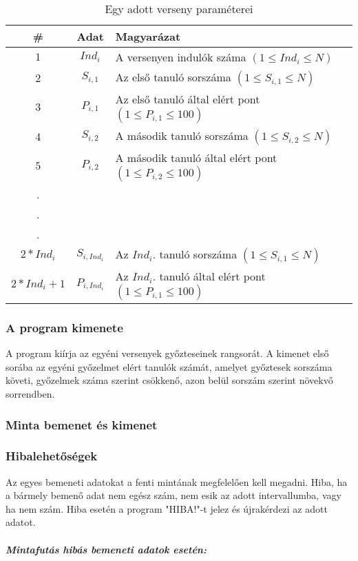 \documentclass[a4paper]{article}
\begin{document}
        \begin{table}[H]
          \centering
          \caption{Egy adott verseny paraméterei}
          \label{tab:table2}
          \begin{tabular}{ccl}
            \toprule
            \# & Adat & Magyarázat \\
            \midrule
            $1$ & $Ind_i$ & A versenyen indulók száma $(1 \leqslant Ind_i \leqslant N)$ \\
            $2$ & $S_{i,1}$ & Az első tanuló sorszáma $(1 \leqslant S_{i,1} \leqslant N)$ \\
            $3$ & $P_{i,1}$ & Az első tanuló által elért pont $(1 \leqslant P_{i,1} \leqslant 100)$ \\
            $4$ & $S_{i,2}$ & A második tanuló sorszáma $(1 \leqslant S_{i,2} \leqslant N)$ \\
            $5$ & $P_{i,2}$ & A második tanuló által elért pont $(1 \leqslant P_{i,2} \leqslant 100)$ \\
            . \\
            . \\
            . \\
            $2*Ind_i$ & $S_{i,Ind_i}$ & Az $Ind_i$. tanuló sorszáma $(1 \leqslant S_{i,1} \leqslant N)$ \\
            $2*Ind_i+1$ & $P_{i,Ind_i}$ & Az $Ind_i$. tanuló által elért pont $(1 \leqslant P_{i,1} \leqslant 100)$ \\
            \bottomrule
          \end{tabular}
        \end{table}
      \subsubsection{A program kimenete}
        A program kiírja az egyéni versenyek győzteseinek rangsorát.
        A kimenet első sorába az egyéni győzelmet elért tanulók számát,
        amelyet győztesek sorszáma követi, győzelmek száma szerint csökkenő,
        azon belül sorszám szerint növekvő sorrendben.
      \subsubsection{Minta bemenet és kimenet}
      \subsubsection{Hibalehetőségek}
        Az egyes bemeneti adatokat a fenti mintának megfelelően kell megadni.
        Hiba, ha a bármely bemenő adat nem egész szám, nem esik az adott intervallumba,
        vagy ha nem szám.
        Hiba esetén a program "HIBA!"-t jelez és újrakérdezi az adott adatot.
        \\
        \subparagraph{Mintafutás hibás bemeneti adatok esetén:}
\end{document}
